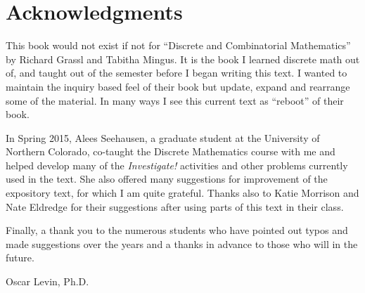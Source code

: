 \section*{Acknowledgments}

This book would not exist if not for ``Discrete and Combinatorial Mathematics'' by Richard Grassl and Tabitha Mingus.  It is the book I learned discrete math out of, and taught out of the semester before I began writing this text.  I wanted to maintain the inquiry based feel of their book but update, expand and rearrange some of the material.  In many ways I see this current text as  ``reboot'' of their book.

In Spring 2015, Alees Seehausen, a graduate student at the University of Northern Colorado, co-taught the Discrete Mathematics course with me and helped develop many of the \emph{Investigate!} activities  and other problems currently used in the text.  She also offered many suggestions for improvement of the expository text, for which I am quite grateful.  Thanks also to Katie Morrison and Nate Eldredge for their suggestions after using parts of this text in their class.

Finally, a thank you to the numerous students who have pointed out typos and made suggestions over the years and a thanks in advance to those who will in the future.

\begin{flushright}
Oscar Levin, Ph.D.
\end{flushright}
\newpage